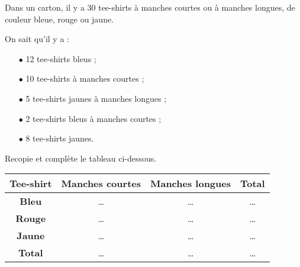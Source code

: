 Dans un carton, il y a 30 tee-shirts à manches courtes ou à manches
longues, de couleur bleue, rouge ou jaune.\par On sait qu'il y a :
\begin{itemize}
\item[$\bullet$] 12 tee-shirts bleus ;
\item[$\bullet$] 10 tee-shirts à manches courtes ;
\item[$\bullet$] 5 tee-shirts jaunes à manches longues ;
\item[$\bullet$] 2 tee-shirts bleus à manches courtes ;
\item[$\bullet$] 8 tee-shirts jaunes.
\end{itemize}
Recopie et complète le tableau ci-dessous.
\begin{center}
  \begin{tabular}{|c|c|c|c|}
\hline
{\bf Tee-shirt}&{\bf Manches courtes}&{\bf Manches longues}&{\bf
  Total}\\
\hline
{\bf Bleu}&\ldots&\ldots&\ldots\\
\hline
{\bf Rouge}&\ldots&\ldots&\ldots\\
\hline
{\bf Jaune}&\ldots&\ldots&\ldots\\
\hline
{\bf Total}&\ldots&\ldots&\ldots\\
\hline
  \end{tabular}
\end{center}